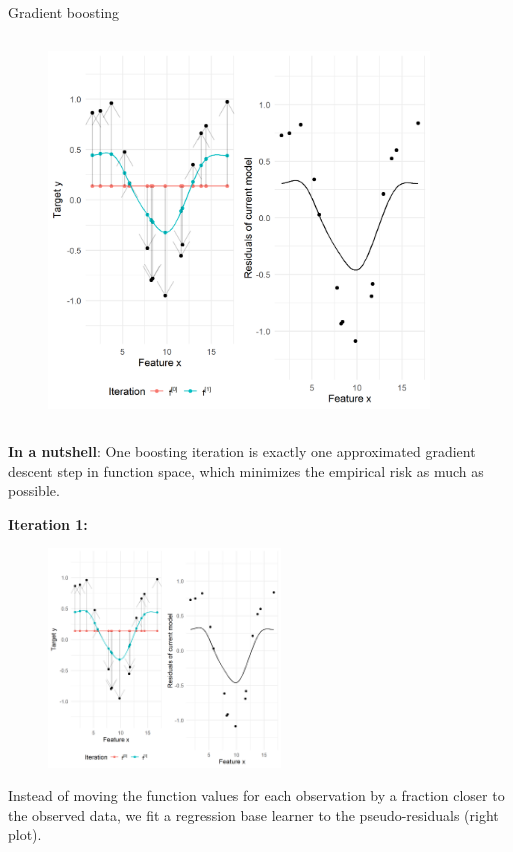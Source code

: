 \begin{vbframe}{Gradient boosting}
\begin{footnotesize}
\begin{columns}
\column{5cm}
\vspace*{-1cm}
\begin{figure}[th]
  \includegraphics[width=0.9\textwidth]{figure_man/gradient-boosting01.png}
\end{figure}


\end{columns}
\end{footnotesize}

\framebreak
\begin{footnotesize}
\textbf{In a nutshell}: One boosting iteration is exactly one approximated gradient descent step in function space,
which minimizes the empirical risk as much as possible.


\vspace*{0.1cm}
\textbf{Iteration 1:}
\begin{figure}
  \includegraphics[width=0.55\textwidth]{figure_man/gradient-boosting01.png}
\end{figure}
\end{footnotesize}
\framebreak
\begin{footnotesize}
Instead of moving the function values for each observation by a fraction closer to the observed data, we fit a regression base learner to the pseudo-residuals (right plot). 



\end{footnotesize}
\end{vbframe}
